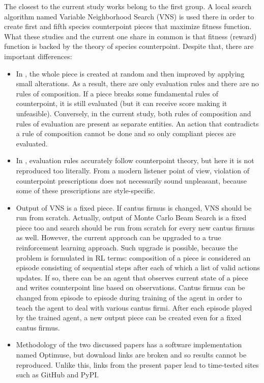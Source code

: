 \documentclass{article}
\begin{document}
The closest to the current study works \cite{herremans2012first, herremans2013fifth} belong to the first group. A local search algorithm named Variable Neighborhood Search (VNS) is used there in order to create first and fifth species counterpoint pieces that maximize fitness function. What these studies and the current one share in common is that fitness (reward) function is backed by the theory of species counterpoint. Despite that, there are important differences:
\begin{itemize}
	\item In \cite{herremans2012first, herremans2013fifth}, the whole piece is created at random and then improved by applying small alterations. As a result, there are only evaluation rules and there are no rules of composition. If a piece breaks some fundamental rules of counterpoint, it is still evaluated (but it can receive score making it unfeasible). Conversely, in the current study, both rules of composition and rules of evaluation are present as separate entities. An action that contradicts a rule of composition cannot be done and so only compliant pieces are evaluated.
	\item In \cite{herremans2012first, herremans2013fifth}, evaluation rules accurately follow counterpoint theory, but here it is not reproduced too literally. From a modern listener point of view, violation of counterpoint prescriptions does not necessarily sound unpleasant, because some of these prescriptions are style-specific.
	\item Output of VNS is a fixed piece. If cantus firmus is changed, VNS should be run from scratch. Actually, output of Monte Carlo Beam Search is a fixed piece too and search should be run from scratch for every new cantus firmus as well. However, the current approach can be upgraded to a true reinforcement learning approach. Such upgrade is possible, because the problem is formulated in RL terms: composition of a piece is considered an episode consisting of sequential steps after each of which a list of valid actions updates. If so, there can be an agent that observes current state of a piece and writes counterpoint line based on observations. Cantus firmus can be changed from episode to episode during training of the agent in order to teach the agent to deal with various cantus firmi. After each episode played by the trained agent, a new output piece can be created even for a fixed cantus firmus.
	\item Methodology of the two discussed papers has a software implementation named Optimuse, but download links are broken and so results cannot be reproduced. Unlike this, links from the present paper lead to time-tested sites such as GitHub and PyPI.
\end{itemize}
\end{document}
